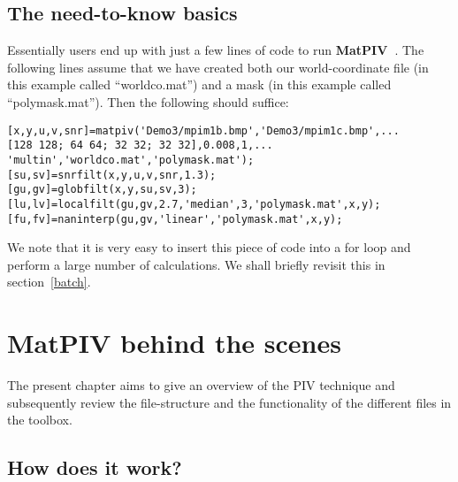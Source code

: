 \documentclass{book}
\newcommand{\matpiv}{{\bf MatPIV~}}
\begin{document}
\section{The need-to-know basics}
\label{essentials}
Essentially users end up with just a few lines of code to run \matpiv.
The following lines assume that we have created both our
world-coordinate file (in this example called ``worldco.mat'') and a
mask (in this example called ``polymask.mat''). Then the following
should suffice:

\begin{verbatim}
[x,y,u,v,snr]=matpiv('Demo3/mpim1b.bmp','Demo3/mpim1c.bmp',...
[128 128; 64 64; 32 32; 32 32],0.008,1,...
'multin','worldco.mat','polymask.mat');
[su,sv]=snrfilt(x,y,u,v,snr,1.3);
[gu,gv]=globfilt(x,y,su,sv,3);
[lu,lv]=localfilt(gu,gv,2.7,'median',3,'polymask.mat',x,y);
[fu,fv]=naninterp(gu,gv,'linear','polymask.mat',x,y);
\end{verbatim}

We note that it is very easy to insert this piece of code into a for
loop and perform a large number of calculations. We shall briefly
revisit this in section~\ref{batch}.

\chapter{{\bf MatPIV} behind the scenes}

The present chapter aims to give an overview of the PIV technique and
subsequently review the file-structure and the functionality of the
different files in the toolbox.

\section{How does it work?}
\end{document}
